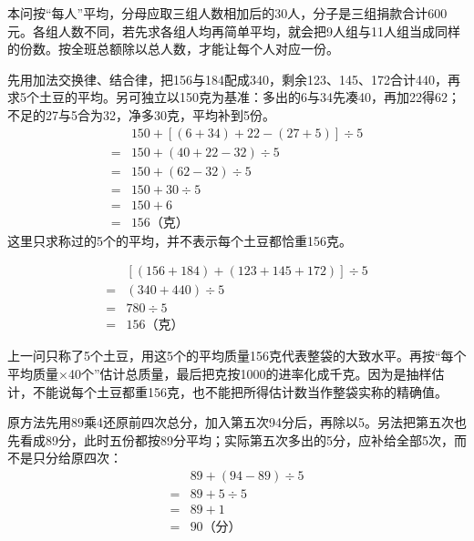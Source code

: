 \documentclass[multi=snippet,border=0pt]{standalone}
\newenvironment{snippet}[3]{\begin{minipage}{#1bp}\color{answerred}\fontsize{#2}{#3}\selectfont\raggedright}{\end{minipage}}
\begin{document}
\begin{snippet}{505}{11.5}{14}本问按“每人”平均，分母应取三组人数相加后的30人，分子是三组捐款合计600元。各组人数不同，若先求各组人均再简单平均，就会把9人组与11人组当成同样的份数。按全班总额除以总人数，才能让每个人对应一份。\end{snippet}
\begin{snippet}{505}{11.5}{14}先用加法交换律、结合律，把156与184配成340，剩余123、145、172合计440，再求5个土豆的平均。另可独立以150克为基准：多出的6与34先凑40，再加22得62；不足的27与5合为32，净多30克，平均补到5份。\[\begin{aligned}&150+[(6+34)+22-(27+5)]\div5\\={}&150+(40+22-32)\div5\\={}&150+(62-32)\div5\\={}&150+30\div5\\={}&150+6\\={}&156\text{（克）}\end{aligned}\]这里只求称过的5个的平均，并不表示每个土豆都恰重156克。\end{snippet}
\begin{snippet}{364}{10.5}{12.8}\[\begin{aligned}&[(156+184)+(123+145+172)]\div5\\={}&(340+440)\div5\\={}&780\div5\\={}&156\text{（克）}\end{aligned}\]\end{snippet}
\begin{snippet}{505}{11.5}{14}上一问只称了5个土豆，用这5个的平均质量156克代表整袋的大致水平。再按“每个平均质量×40个”估计总质量，最后把克按1000的进率化成千克。因为是抽样估计，不能说每个土豆都重156克，也不能把所得估计数当作整袋实称的精确值。\end{snippet}
\begin{snippet}{505}{11.5}{14}原方法先用89乘4还原前四次总分，加入第五次94分后，再除以5。另法把第五次也先看成89分，此时五份都按89分平均；实际第五次多出的5分，应补给全部5次，而不是只分给原四次：\[\begin{aligned}&89+(94-89)\div5\\={}&89+5\div5\\={}&89+1\\={}&90\text{（分）}\end{aligned}\]\end{snippet}
\end{document}
